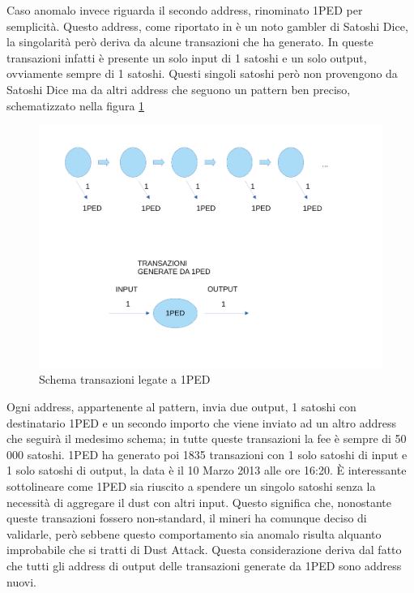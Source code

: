 Caso anomalo invece riguarda il secondo address, rinominato 1PED per semplicità. Questo address, come riportato in \cite{dustAnalisi} è un noto gambler di Satoshi Dice, la singolarità però deriva da alcune transazioni che ha generato. In queste transazioni infatti è presente un solo input di 1 satoshi e un solo output, ovviamente sempre di 1 satoshi. Questi singoli satoshi però non provengono da Satoshi Dice ma da altri address che seguono un pattern ben preciso, schematizzato nella figura \ref{fig:1PED}
\begin{figure}[h!]
    \centering
    \includegraphics[scale=0.4]{Images/1Ped.pdf}
    \caption{Schema transazioni legate a 1PED}
    \label{fig:1PED}
\end{figure}
\FloatBarrier
Ogni address, appartenente al pattern, invia due output, 1 satoshi con destinatario 1PED e un secondo importo che viene inviato ad un altro address che seguirà il medesimo schema; in tutte queste transazioni la fee è sempre di 50 000 satoshi. 1PED ha generato poi 1835 transazioni con 1 solo satoshi di input e 1 solo satoshi di output, la data è il 10 Marzo 2013 alle ore 16:20. È interessante sottolineare come 1PED sia riuscito a spendere un singolo satoshi senza la necessità di aggregare il dust con altri input. Questo significa che, nonostante queste transazioni fossero non-standard, il mineri ha comunque deciso di validarle, però sebbene questo comportamento sia anomalo risulta alquanto improbabile che si tratti di Dust Attack. Questa considerazione deriva dal fatto che tutti gli address di output delle transazioni generate da 1PED sono address nuovi.
